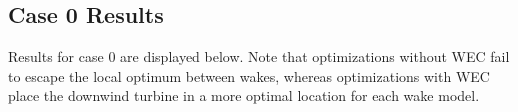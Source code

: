 \documentclass[a4paper]{jpconf}
\begin{document}

\subsection{Case 0 Results}
Results for case 0 are displayed below. Note that optimizations without WEC fail to escape the local optimum between wakes, whereas optimizations with WEC place the downwind turbine in a more optimal location for each wake model.
\end{document}
